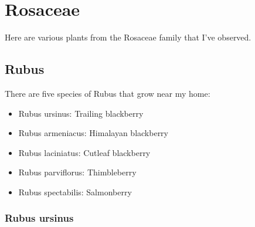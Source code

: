 \chapter{Rosaceae}

Here are various plants from the Rosaceae family that I've observed.

\section{Rubus}

There are five species of Rubus that grow near my home:
\begin{itemize}
	\item
	Rubus ursinus: Trailing blackberry
	\item
	Rubus armeniacus: Himalayan blackberry
	\item
	Rubus laciniatus: Cutleaf blackberry
	\item
	Rubus parviflorus: Thimbleberry
	\item
	Rubus spectabilis: Salmonberry
\end{itemize}

\subsection{Rubus ursinus}

